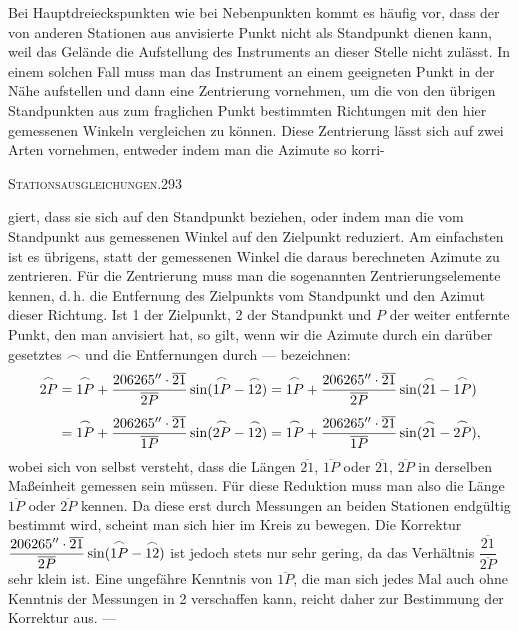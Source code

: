 Bei Hauptdreieckspunkten wie bei Nebenpunkten kommt es häufig vor, dass der von anderen Stationen aus anvisierte Punkt nicht als Standpunkt dienen kann, weil das Gelände die Aufstellung des Instruments an dieser Stelle nicht zulässt. In einem solchen Fall muss man das Instrument an einem geeigneten Punkt in der Nähe aufstellen und dann eine Zentrierung vornehmen, um die von den übrigen Standpunkten aus zum fraglichen Punkt bestimmten Richtungen mit den hier gemessenen Winkeln vergleichen zu können. Diese Zentrierung lässt sich auf zwei Arten vornehmen, entweder indem man die Azimute  so korri-

\clearpage
\noindent\mbox{}\hfill\textsc{Stationsausgleichungen.}\hfill293\par\medskip
\noindent giert, dass sie sich auf den Standpunkt beziehen, oder indem man die vom Standpunkt aus gemessenen Winkel auf den Zielpunkt reduziert. Am einfachsten ist es übrigens, statt der gemessenen Winkel die daraus berechneten Azimute zu zentrieren. Für die Zentrierung muss man die sogenannten Zentrierungselemente kennen, d.\,h. die Entfernung des Zielpunkts vom Standpunkt und den Azimut dieser Richtung. Ist 1 der Zielpunkt, 2 der Standpunkt und $P$ der weiter entfernte Punkt, den man anvisiert hat, so gilt, wenn wir die Azimute durch ein darüber gesetztes $\frown$ und die Entfernungen durch --- bezeichnen:
\[
\begin{aligned}
\overset{\frown}{2P}&=\overset{\frown}{1P}+\frac{206265''\cdot\overline{21}}{\overline{2P}}\sin(\overset{\frown}{1P}-\overset{\frown}{12})
=\overset{\frown}{1P}+\frac{206265''\cdot\overline{21}}{\overline{2P}}\sin(\overset{\frown}{21}-\overset{\frown}{1P})\\[4pt]
&=\overset{\frown}{1P}+\frac{206265''\cdot\overline{21}}{\overline{1P}}\sin(\overset{\frown}{2P}-\overset{\frown}{12})
=\overset{\frown}{1P}+\frac{206265''\cdot\overline{21}}{\overline{1P}}\sin(\overset{\frown}{21}-\overset{\frown}{2P}),
\end{aligned}
\]
wobei sich von selbst versteht, dass die Längen $\overline{21}$, $\overline{1P}$ oder $\overline{21}$, $\overline{2P}$ in derselben Maßeinheit gemessen sein müssen. Für diese Reduktion muss man also die Länge $\overline{1P}$ oder $\overline{2P}$ kennen. Da diese erst durch Messungen an beiden Stationen endgültig bestimmt wird, scheint man sich hier im Kreis zu bewegen. Die Korrektur $\dfrac{206265''\cdot\overline{21}}{\overline{2P}}\sin(\overset{\frown}{1P}-\overset{\frown}{12})$ ist jedoch stets nur sehr gering, da das Verhältnis $\dfrac{\overline{21}}{\overline{2P}}$ sehr klein ist. Eine ungefähre Kenntnis von $\overline{1P}$, die man sich jedes Mal auch ohne Kenntnis der Messungen in 2 verschaffen kann, reicht daher zur Bestimmung der Korrektur aus. ---

